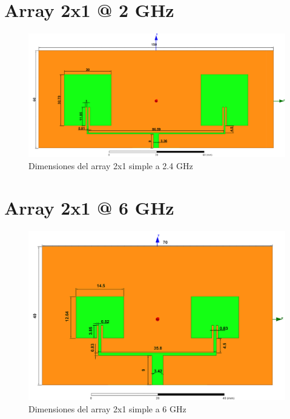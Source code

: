 \section{Array 2x1 @ 2 GHz}
\vfill
\begin{figure}[H]
   	 \centering
        \includegraphics[width=19cm ,height=\textwidth, keepaspectratio=true,angle=90,origin=c]{archivos/desarrollo/autocad/3}
        \caption{Dimensiones del array 2x1 simple a 2.4 GHz}
        \label{fig:2x11}
\end{figure}
\vfill
\newpage

\section{Array 2x1 @ 6 GHz}
\vfill
\begin{figure}[H]
   	 \centering
        \includegraphics[width=19cm ,height=\textheight, keepaspectratio=true,angle=90,origin=c]{archivos/desarrollo/autocad/4}
        \caption{Dimensiones del array 2x1 simple a 6 GHz}
        \label{fig:2x12}
\end{figure}
\vfill
\newpage

